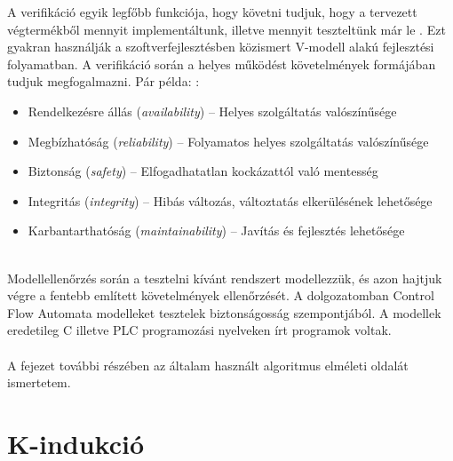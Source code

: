 A verifikáció egyik legfőbb funkciója, hogy követni tudjuk, hogy a tervezett végtermékből mennyit implementáltunk, illetve mennyit teszteltünk már le \cite{DenkeAkos14}. Ezt gyakran használják a szoftverfejlesztésben közismert V-modell alakú fejlesztési folyamatban. A verifikáció során a helyes működést követelmények formájában tudjuk megfogalmazni. Pár példa: \cite{alapfogalmak}:
\begin{itemize}
	\item Rendelkezésre állás (\emph{availability}) -- Helyes szolgáltatás valószínűsége
	\item Megbízhatóság (\emph{reliability}) -- Folyamatos helyes szolgáltatás valószínűsége
	\item Biztonság (\emph{safety}) -- Elfogadhatatlan kockázattól való mentesség
	\item Integritás (\emph{integrity}) -- Hibás változás, változtatás elkerülésének lehetősége
	\item Karbantarthatóság (\emph{maintainability}) -- Javítás és fejlesztés lehetősége
\end{itemize}
\ \\
Modellellenőrzés során a tesztelni kívánt rendszert modellezzük, és azon hajtjuk végre a fentebb említett követelmények ellenőrzését. A dolgozatomban Control Flow Automata modelleket tesztelek biztonságosság szempontjából. A modellek eredetileg C illetve PLC programozási nyelveken írt programok voltak.
\\
\\
A fejezet további részében az általam használt algoritmus elméleti oldalát ismertetem.

\section{K-indukció}
\label{sec:k_induction}

